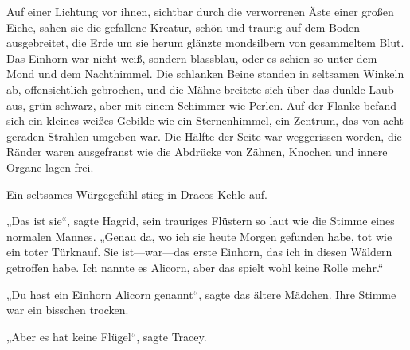 Auf einer Lichtung vor ihnen, sichtbar durch die verworrenen Äste einer großen Eiche, sahen sie die gefallene Kreatur, schön und traurig auf dem Boden ausgebreitet, die Erde um sie herum glänzte mondsilbern von gesammeltem Blut. Das Einhorn war nicht weiß, sondern blassblau, oder es schien so unter dem Mond und dem Nachthimmel. Die schlanken Beine standen in seltsamen Winkeln ab, offensichtlich gebrochen, und die Mähne breitete sich über das dunkle Laub aus, grün-schwarz, aber mit einem Schimmer wie Perlen. Auf der Flanke befand sich ein kleines weißes Gebilde wie ein Sternenhimmel, ein Zentrum, das von acht geraden Strahlen umgeben war. Die Hälfte der Seite war weggerissen worden, die Ränder waren ausgefranst wie die Abdrücke von Zähnen, Knochen und innere Organe lagen frei.

Ein seltsames Würgegefühl stieg in Dracos Kehle auf.

„Das ist sie“, sagte Hagrid, sein trauriges Flüstern so laut wie die Stimme eines normalen Mannes. „Genau da, wo ich sie heute Morgen gefunden habe, tot wie ein toter Türknauf. Sie ist—war—das erste Einhorn, das ich in diesen Wäldern getroffen habe. Ich nannte es Alicorn, aber das spielt wohl keine Rolle mehr.“

„Du hast ein Einhorn Alicorn genannt“, sagte das ältere Mädchen. Ihre Stimme war ein bisschen trocken.

„Aber es hat keine Flügel“, sagte Tracey.

